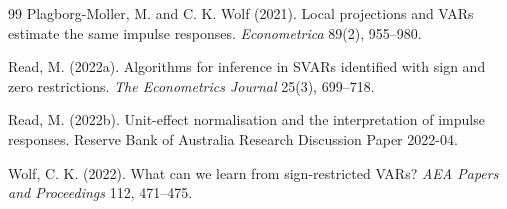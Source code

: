 \documentclass[11pt]{article}
\theoremstyle{definition}
\theoremstyle{plain}
\theoremstyle{remark}
\begin{document}
\begin{thebibliography}{99}
Plagborg-Moller, M. and C. K. Wolf (2021).
Local projections and VARs estimate the same impulse responses.
\emph{Econometrica} 89(2), 955--980.

Read, M. (2022a).
Algorithms for inference in SVARs identified with sign and zero restrictions.
\emph{The Econometrics Journal} 25(3), 699--718.

Read, M. (2022b).
Unit-effect normalisation and the interpretation of impulse responses.
Reserve Bank of Australia Research Discussion Paper 2022-04.

Wolf, C. K. (2022).
What can we learn from sign-restricted VARs?
\emph{AEA Papers and Proceedings} 112, 471--475.
\end{thebibliography}
\end{document}
